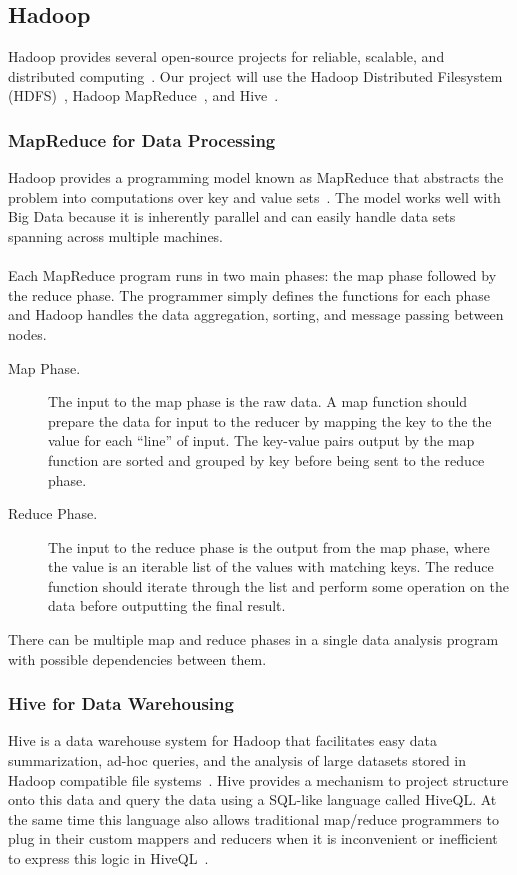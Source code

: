 \documentclass[letterpaper,12pt,titlepage]{article}
\begin{document}
\subsection{Hadoop}
Hadoop provides several open-source projects for reliable, scalable, and
distributed computing~\cite{hadoop}. Our project will use the
Hadoop Distributed Filesystem (HDFS)~\cite{hdfs}, Hadoop
MapReduce~\cite{mapreduce}, and Hive~\cite{hive}.

\subsubsection{MapReduce for Data Processing}
Hadoop provides a programming model known as MapReduce that abstracts the
problem into computations over key and value sets~\cite{mapreduce}. The model
works well with Big Data because it is inherently parallel and can easily handle
data sets
spanning across multiple machines. 
\\\\
Each MapReduce program runs in two main phases: the map phase followed by the
reduce phase. The programmer simply defines the functions for each phase and
Hadoop handles the data aggregation, sorting, and message passing between nodes.

\begin{description}
 \item[Map Phase.] The input to the map phase is the raw data. A map function
should prepare the data for input to the reducer by mapping the key to the the
value for each ``line'' of input. The key-value pairs output by the map function
are sorted and grouped by key before being sent to the reduce phase. 
 \item[Reduce Phase.] The input to the reduce phase is the output from the map
phase, where the value is an iterable list of the values with matching keys.
The reduce function should iterate through the list and perform some operation
on the data before outputting the final result. 
 \end{description}
There can be multiple map and reduce phases in a single data analysis program
with possible dependencies between them.

\subsubsection{Hive for Data Warehousing}
Hive is a data warehouse system for Hadoop that facilitates easy data
summarization, ad-hoc queries, and the analysis of large datasets stored in
Hadoop compatible file systems~\cite{hive}. Hive provides a mechanism to project
structure
onto this data and query the data using a SQL-like language called HiveQL. At
the same time this language also allows traditional map/reduce programmers to
plug in their custom mappers and reducers when it is inconvenient or inefficient
to express this logic in HiveQL~\cite{hive}.
\end{document}

